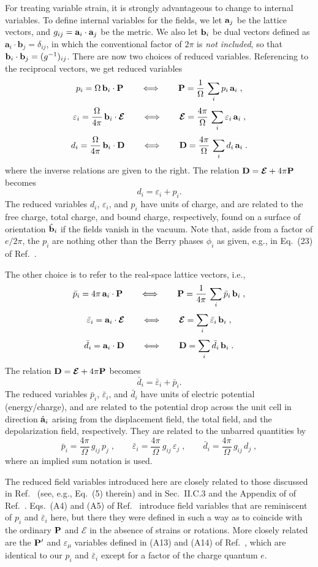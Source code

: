 \documentclass[11pt,fleqn]{article}
\def\beq{\begin{equation}}
\def\eeq{\end{equation}}
\def\P{{\bf P}}
\def\a{{\bf a}}
\def\b{{\bf b}}
\def\E{\mathcal{E}}
\def\EE{\bm{\E}}
\def\D{{\bf D}}
\def\pb{^{\rm bulk}}
\def\ee{{\varepsilon}}
\def\pb{\bar{p}}
\def\eb{\bar{\ee}}
\def\db{\bar{d}}
\def\O{\Omega}
\def\foo{\frac{4\pi}{\O}}
\def\gg{g_{ij}}
\begin{document}
For treating variable strain, it is strongly advantageous to change
to internal variables.
To define internal variables for the fields, we let $\a_j$ be the
lattice vectors, and $g_{ij}=\a_i\cdot \a_j$ be the metric.
We also let $\b_i$ be dual vectors defined as $\mathbf{a}_i\cdot\mathbf{b}_j=\delta_{ij}$, 
in which the conventional factor of $2\pi$ is {\it not included}, so that
 $\b_i\cdot\b_j=(g^{-1})_{ij}$.
There are now two choices of reduced variables.  Referencing to
the reciprocal vectors, we get reduced variables
%
\beq
p_i=\Omega\,\b_i\cdot\P
\qquad \Longleftrightarrow \qquad
\P=\frac{1}{\O}\,\sum_i p_i\,\a_i \;,
\eeq
\beq
\ee_i=\frac{\Omega}{4\pi}\,\b_i\cdot\EE
\qquad \Longleftrightarrow \qquad
\EE=\frac{4\pi}{\O}\,\sum_i \ee_i\,\a_i \;,
\eeq
\beq
d_i = \frac{\Omega}{4\pi}\,\b_i\cdot\D
\qquad \Longleftrightarrow \qquad
\D=\frac{4\pi}{\O}\,\sum_i d_i\,\a_i \;.
\eeq
%
where the inverse relations are given to the right.
The relation $\D=\EE+4\pi\P$ becomes 
%
\beq
d_i=\ee_i+p_i.
\eeq
%
The reduced variables $d_i$, $\ee_i$, and $p_i$ have units of charge,
and are related to the free charge, total charge, and bound charge,
respectively, found on a surface of orientation $\hat{\b}_i$ if the
fields vanish in the vacuum.
Note that, aside from a factor of $e/2\pi$, the $p_i$ are nothing other
than the Berry phases $\phi_i$ as given, e.g., in Eq.~(23) of
Ref.~\cite{proper}.

The other choice is to refer to the real-space lattice
vectors, i.e.,
%
\beq
\pb_i= 4\pi\,\a_i\cdot\P
\qquad \Longleftrightarrow \qquad
\P= \frac{1}{4\pi}\, \sum_i \pb_i\,\b_i \;,
\eeq
\beq
\eb_i= \a_i\cdot\EE
\qquad \Longleftrightarrow \qquad
\EE= \sum_i \eb_i\,\b_i \;,
\eeq
\beq
\db_i= \a_i\cdot\D
\qquad \Longleftrightarrow \qquad
\D= \sum_i \db_i\,\b_i \;.
\eeq
%
The relation $\D=\EE+4\pi\P$ becomes 
%
\beq
\db_i=\eb_i+\pb_i.
\eeq
%
The reduced variables $\pb_i$, $\eb_i$, and $\db_i$ have units of
electric potential (energy/charge),
and are related to the potential drop across the unit cell in
direction $\hat{\a}_i$ arising from the displacement field, the
total field, and the depolarization field, respectively.  They
are related to the unbarred quantities by
%
\beq
\pb_i=\foo\,\gg\,p_j \;,
\qquad
\eb_i=\foo\,\gg\,\ee_j \;,
\qquad
\db_i=\foo\,\gg\,d_j \;,
\eeq
where an implied sum notation is used.

The reduced field variables introduced here are closely related to
those discussed in Ref.~\cite{siv} (see, e.g., Eq.~(5) therein) and
in Sec.~II.C.3 and the Appendix of of Ref.~\cite{wvh}.
Eqs.~(A4) and (A5) of Ref.~\cite{wvh} introduce field
variables that are reminiscent of $p_i$ and $\eb_i$ here,
but there they were defined in such a way as to coincide
with the ordinary $\P$ and $\EE$ in the absence of strains or
rotations.  More closely related are the $\P'$ and $\ee_\mu$
variables defined in (A13) and (A14) of Ref.~\cite{wvh}, which are identical
to our $p_i$ and $\eb_i$ except for a factor of the charge quantum
$e$.
\end{document}

